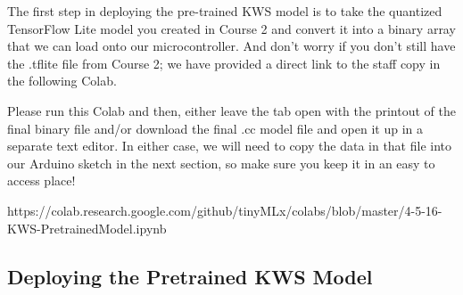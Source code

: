     The first step in deploying the pre-trained KWS model is to take the quantized TensorFlow Lite model you created in Course 2 and convert it into a binary array that we can load onto our microcontroller. And don’t worry if you don’t still have the .tflite file from Course 2; we have provided a direct link to the staff copy in the following Colab.
    
    Please run this Colab and then, either leave the tab open with the printout of the final binary file and/or download the final .cc model file and open it up in a separate text editor. In either case, we will need to copy the data in that file into our Arduino sketch in the next section, so make sure you keep it in an easy to access place!
    
    https://colab.research.google.com/github/tinyMLx/colabs/blob/master/4-5-16-KWS-PretrainedModel.ipynb
    
\subsection{Deploying the Pretrained KWS Model}


